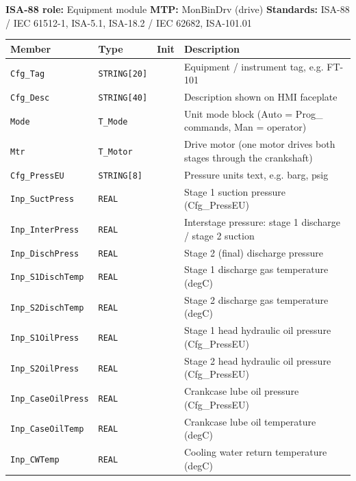 {\small\textbf{ISA-88 role:} Equipment module \quad \textbf{MTP:} MonBinDrv (drive) \quad \textbf{Standards:} ISA-88 /\allowbreak{} IEC 61512-1, ISA-5.1, ISA-18.2 /\allowbreak{} IEC 62682, ISA-101.01}
{\footnotesize
\begin{longtable}{@{}>{\raggedright\arraybackslash}p{3.4cm}>{\raggedright\arraybackslash}p{3.3cm}>{\raggedright\arraybackslash}p{1.3cm}>{\raggedright\arraybackslash}p{6.4cm}@{}}
\toprule
\rowcolor{tblhead}\textbf{Member} & \textbf{Type} & \textbf{Init} & \textbf{Description} \\
\midrule
\endhead
\texttt{Cfg\_Tag} & \texttt{STRING[20]} &  & Equipment /\allowbreak{} instrument tag, e.g. FT-101 \\
\texttt{Cfg\_Desc} & \texttt{STRING[40]} &  & Description shown on HMI faceplate \\
\texttt{Mode} & \texttt{T\_Mode} &  & Unit mode block (Auto = Prog\_ commands, Man = operator) \\
\texttt{Mtr} & \texttt{T\_Motor} &  & Drive motor (one motor drives both stages through the crankshaft) \\
\texttt{Cfg\_PressEU} & \texttt{STRING[8]} &  & Pressure units text, e.g. barg, psig \\
\texttt{Inp\_SuctPress} & \texttt{REAL} &  & Stage 1 suction pressure (Cfg\_PressEU) \\
\texttt{Inp\_InterPress} & \texttt{REAL} &  & Interstage pressure: stage 1 discharge /\allowbreak{} stage 2 suction \\
\texttt{Inp\_DischPress} & \texttt{REAL} &  & Stage 2 (final) discharge pressure \\
\texttt{Inp\_S1DischTemp} & \texttt{REAL} &  & Stage 1 discharge gas temperature (degC) \\
\texttt{Inp\_S2DischTemp} & \texttt{REAL} &  & Stage 2 discharge gas temperature (degC) \\
\texttt{Inp\_S1OilPress} & \texttt{REAL} &  & Stage 1 head hydraulic oil pressure (Cfg\_PressEU) \\
\texttt{Inp\_S2OilPress} & \texttt{REAL} &  & Stage 2 head hydraulic oil pressure (Cfg\_PressEU) \\
\texttt{Inp\_CaseOilPress} & \texttt{REAL} &  & Crankcase lube oil pressure (Cfg\_PressEU) \\
\texttt{Inp\_CaseOilTemp} & \texttt{REAL} &  & Crankcase lube oil temperature (degC) \\
\texttt{Inp\_CWTemp} & \texttt{REAL} &  & Cooling water return temperature (degC) \\

\end{longtable}}

